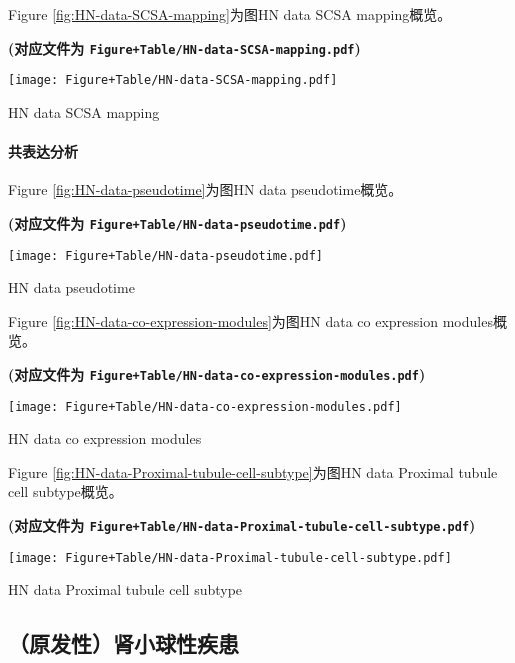 \documentclass[
]{article}
\begin{document}
Figure \ref{fig:HN-data-SCSA-mapping}为图HN data SCSA mapping概览。

\textbf{(对应文件为 \texttt{Figure+Table/HN-data-SCSA-mapping.pdf})}

\def\@captype{figure}
\begin{center}
\texttt{[image: Figure+Table/HN-data-SCSA-mapping.pdf]}
\caption{HN data SCSA mapping}\label{fig:HN-data-SCSA-mapping}
\end{center}

\hypertarget{ux5171ux8868ux8fbeux5206ux6790}{%
\paragraph{共表达分析}\label{ux5171ux8868ux8fbeux5206ux6790}}

Figure \ref{fig:HN-data-pseudotime}为图HN data pseudotime概览。

\textbf{(对应文件为 \texttt{Figure+Table/HN-data-pseudotime.pdf})}

\def\@captype{figure}
\begin{center}
\texttt{[image: Figure+Table/HN-data-pseudotime.pdf]}
\caption{HN data pseudotime}\label{fig:HN-data-pseudotime}
\end{center}

Figure \ref{fig:HN-data-co-expression-modules}为图HN data co expression modules概览。

\textbf{(对应文件为 \texttt{Figure+Table/HN-data-co-expression-modules.pdf})}

\def\@captype{figure}
\begin{center}
\texttt{[image: Figure+Table/HN-data-co-expression-modules.pdf]}
\caption{HN data co expression modules}\label{fig:HN-data-co-expression-modules}
\end{center}

Figure \ref{fig:HN-data-Proximal-tubule-cell-subtype}为图HN data Proximal tubule cell subtype概览。

\textbf{(对应文件为 \texttt{Figure+Table/HN-data-Proximal-tubule-cell-subtype.pdf})}

\def\@captype{figure}
\begin{center}
\texttt{[image: Figure+Table/HN-data-Proximal-tubule-cell-subtype.pdf]}
\caption{HN data Proximal tubule cell subtype}\label{fig:HN-data-Proximal-tubule-cell-subtype}
\end{center}

\hypertarget{ux539fux53d1ux6027ux80beux5c0fux7403ux6027ux75beux60a3}{%
\subsection{（原发性）肾小球性疾患}\label{ux539fux53d1ux6027ux80beux5c0fux7403ux6027ux75beux60a3}}
\end{document}
